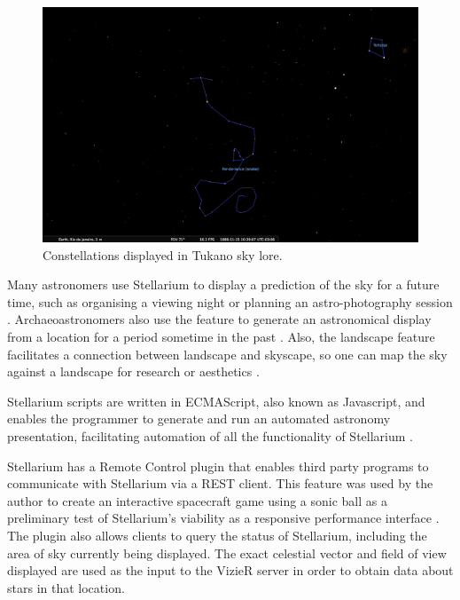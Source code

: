 \begin{figure}[htbp]
	\centering
	\includegraphics[width=1\columnwidth]{TukanoTortoise}
	\caption{Constellations displayed in Tukano sky lore.}
	\label{fig:TukanoTortoise}
\end{figure}

Many astronomers use Stellarium to display a prediction of the sky for a future time, such as organising a viewing night or planning an astro-photography session \cite{ashley2015computers}. Archaeoastronomers  also use the feature to generate an astronomical display from a location for a period sometime in the past \cite{zotti2014towards}. Also, the landscape feature facilitates a connection between  landscape and  skyscape, so one can map the sky against a landscape for research or aesthetics \cite{zotti2017skyscape}.

Stellarium scripts are written in ECMAScript, also known as Javascript, and enables the programmer to generate and run an automated astronomy presentation, facilitating  automation of all the functionality of Stellarium  \cite{zottistellarium}.

Stellarium has a Remote Control plugin that enables third party programs to communicate with Stellarium via a REST client. This feature was used by the author to create an interactive spacecraft game using a sonic ball as a preliminary test of Stellarium's viability as a responsive performance interface \cite{fraiettaLAC2019}. The plugin also allows clients to query the status of Stellarium, including the area of sky currently being displayed.  The exact celestial vector and field of view displayed are used as the input to the VizieR server in order to obtain data about stars in that location.

